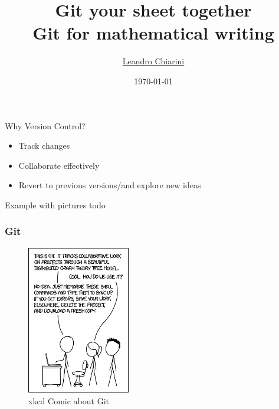 \documentclass[12pt,t]{beamer}
\title{{\Huge Git your sheet together} \\ Git for mathematical writing}
\author{\href{http://lchiarini.com}{Leandro Chiarini}}
\institute{Durham University}
\date{\today \\
	\vspace{2em}
}
\def\red{\color{Red}}
\begin{document}
{
\frame{ \titlepage
   } }


\begin{frame}{Why Version Control?}
\begin{itemize}
		\pause
		\vspace{1em}
    \item Track changes 
		\pause
		\vspace{1em}
    \item Collaborate effectively 
		\pause
		\vspace{1em}
    \item Revert to previous versions/and explore new ideas
		\pause
\end{itemize}

\end{frame}

\begin{frame}{Example with pictures}
	{\red todo}
\end{frame} 

\begin{frame}\frametitle{Git}
%
\pause
\begin{figure}[ht]
    \centering
    \includegraphics[width=0.4\textwidth]{figs/git-xkcd-comic.png}
	\caption{xkcd Comic about Git}
\end{figure}
%
\end{frame}
\end{document}
